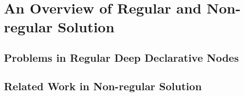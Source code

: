 \chapter{An Overview of Regular and Non-regular Solution}
\label{cha:overviewpart2}

\section{Problems in Regular Deep Declarative Nodes}
\label{sec:problems}



\section{Related Work in Non-regular Solution}
\label{sec:relatedworknonreg}






%   






